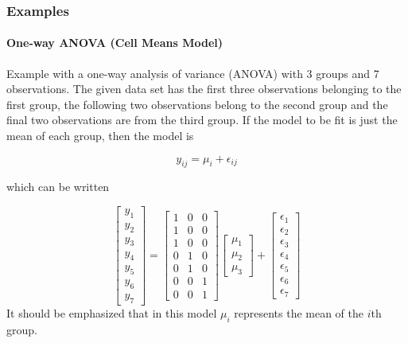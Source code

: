 \subsubsection{Examples}

\paragraph{One-way ANOVA (Cell Means Model)}
Example with a one-way analysis of variance (ANOVA) with 3 groups and 7 observations. The given data set has the first three observations belonging to the first group, the following two observations belong to the second group and the final two observations are from the third group.
If the model to be fit is just the mean of each group, then the model is

\begin{equation}
  y_{ij} = \mu_i + \epsilon_{ij}
\end{equation}

which can be written

\begin{equation}
  \begin{bmatrix}y_1 \\ y_2 \\ y_3 \\ y_4 \\ y_5 \\ y_6 \\ y_7 \end{bmatrix} =
  \begin{bmatrix}1 & 0 & 0 \\1 &0  &0 \\ 1 & 0 & 0 \\  0 & 1 & 0 \\  0 & 1 & 0 \\  0 & 0 & 1 \\  0 & 0 & 1\end{bmatrix}
  \begin{bmatrix}\mu_1 \\ \mu_2 \\ \mu_3  \end{bmatrix}
  +
  \begin{bmatrix} \epsilon_1 \\ \epsilon_2 \\ \epsilon_3 \\ \epsilon_4 \\ \epsilon_5 \\ \epsilon_6 \\ \epsilon_7 \end{bmatrix}
\end{equation}
It should be emphasized that in this model $\mu_i$ represents the mean of the $i$th group.

